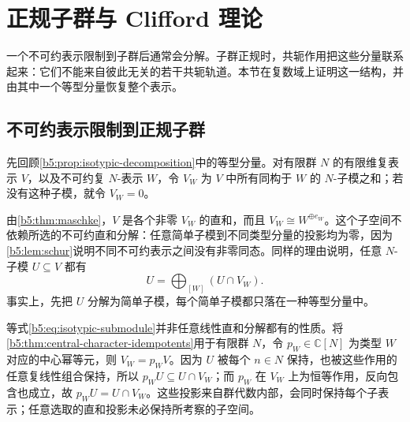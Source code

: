 

\section{正规子群与 Clifford 理论}
\label{b5:sec:0403}

一个不可约表示限制到子群后通常会分解。子群正规时，共轭作用把这些分量联系起来：它们不能来自彼此无关的若干共轭轨道。本节在复数域上证明这一结构，并由其中一个等型分量恢复整个表示。

\subsection{不可约表示限制到正规子群}
\label{b5:subsec:0403:01}

先回顾\cref{b5:prop:isotypic-decomposition}中的等型分量。对有限群 \(N\) 的有限维复表示 \(V\)，以及不可约复 \(N\)-表示 \(W\)，令 \(V_W\) 为 \(V\) 中所有同构于 \(W\) 的 \(N\)-子模之和；若没有这种子模，就令 \(V_W=0\)。

\ProseParagraphBreak

由\cref{b5:thm:maschke}，\(V\) 是各个非零 \(V_W\) 的直和，而且 \(V_W\cong W^{\oplus e_W}\)。这个子空间不依赖所选的不可约直和分解：任意简单子模到不同类型分量的投影均为零，因为\cref{b5:lem:schur}说明不同不可约表示之间没有非零同态。同样的理由说明，任意 \(N\)-子模 \(U\subseteq V\) 都有
\begin{equation}\label{b5:eq:isotypic-submodule}
	U=\bigoplus_{[W]}(U\cap V_W).
\end{equation}
事实上，先把 \(U\) 分解为简单子模，每个简单子模都只落在一种等型分量中。

\ProseParagraphBreak
等式\eqref{b5:eq:isotypic-submodule}并非任意线性直和分解都有的性质。将\cref{b5:thm:central-character-idempotents}用于有限群 \(N\)，令 \(p_W\in\mathbb C[N]\) 为类型 \(W\) 对应的中心幂等元，则 \(V_W=p_WV\)。因为 \(U\) 被每个 \(n\in N\) 保持，也被这些作用的任意复线性组合保持，所以 \(p_WU\subseteq U\cap V_W\)；而 \(p_W\) 在 \(V_W\) 上为恒等作用，反向包含也成立，故 \(p_WU=U\cap V_W\)。这些投影来自群代数内部，会同时保持每个子表示；任意选取的直和投影未必保持所考察的子空间。

